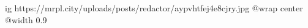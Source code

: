  
 
 
 
 

\ifcmt
  ig https://mrpl.city/uploads/posts/redactor/aypvhtfej4e8cjry.jpg
  @wrap center
  @width 0.9
\fi
